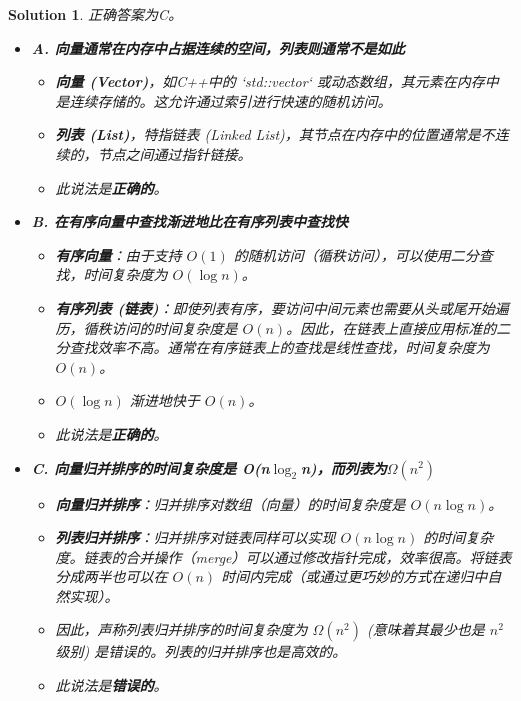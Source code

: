 \documentclass[UTF8]{report}
\newtheorem{solution}{Solution}
\theoremstyle{MyLineTheoremStyle} %
\theoremstyle{MyBlockTheoremStyle} %
\theoremstyle{MySubsubsectionStyle} %
\begin{document}
\begin{solution}
正确答案为C。

\begin{itemize}
    \item \textbf{A. 向量通常在内存中占据连续的空间，列表则通常不是如此}
    \begin{itemize}
        \item \textbf{向量 (Vector)}，如C++中的 `std::vector` 或动态数组，其元素在内存中是连续存储的。这允许通过索引进行快速的随机访问。
        \item \textbf{列表 (List)}，特指链表 (Linked List)，其节点在内存中的位置通常是不连续的，节点之间通过指针链接。
        \item 此说法是\textbf{正确的}。
    \end{itemize}

    \item \textbf{B. 在有序向量中查找渐进地比在有序列表中查找快}
    \begin{itemize}
        \item \textbf{有序向量}：由于支持 $O(1)$ 的随机访问（循秩访问），可以使用二分查找，时间复杂度为 $O(\log n)$。
        \item \textbf{有序列表 (链表)}：即使列表有序，要访问中间元素也需要从头或尾开始遍历，循秩访问的时间复杂度是 $O(n)$。因此，在链表上直接应用标准的二分查找效率不高。通常在有序链表上的查找是线性查找，时间复杂度为 $O(n)$。
        \item $O(\log n)$ 渐进地快于 $O(n)$。
        \item 此说法是\textbf{正确的}。
    \end{itemize}

    \item \textbf{C. 向量归并排序的时间复杂度是 O(n$\log_{2}$n)，而列表为$\Omega(n^2)$}
    \begin{itemize}
        \item \textbf{向量归并排序}：归并排序对数组（向量）的时间复杂度是 $O(n \log n)$。
        \item \textbf{列表归并排序}：归并排序对链表同样可以实现 $O(n \log n)$ 的时间复杂度。链表的合并操作（merge）可以通过修改指针完成，效率很高。将链表分成两半也可以在 $O(n)$ 时间内完成（或通过更巧妙的方式在递归中自然实现）。
        \item 因此，声称列表归并排序的时间复杂度为 $\Omega(n^2)$ (意味着其最少也是 $n^2$ 级别) 是错误的。列表的归并排序也是高效的。
        \item 此说法是\textbf{错误的}。
    \end{itemize}


\end{itemize}
\end{solution}
\end{document}
